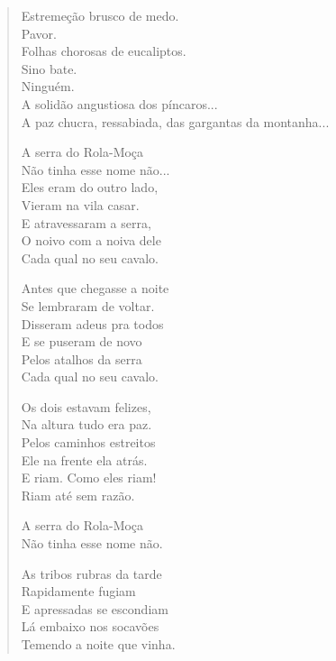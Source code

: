 \begin{verse}
Estremeção brusco de medo.\\
Pavor.\\
Folhas chorosas de eucaliptos.\\
Sino bate.\\
Ninguém.\\
A solidão angustiosa dos píncaros...\\
A paz chucra, ressabiada, das gargantas da montanha...


\quad\quad\quad{}A serra do Rola-Moça\\
\quad\quad\quad{}Não tinha esse nome não...\\
\quad\quad\quad{}Eles eram do outro lado,\\
\quad\quad\quad{}Vieram na vila casar.\\
\quad\quad\quad{}E atravessaram a serra,\\
\quad\quad\quad{}O noivo com a noiva dele\\
\quad\quad\quad{}Cada qual no seu cavalo.

\quad\quad\quad{}Antes que chegasse a noite\\
\quad\quad\quad{}Se lembraram de voltar.\\
\quad\quad\quad{}Disseram adeus pra todos\\
\quad\quad\quad{}E se puseram de novo\\
\quad\quad\quad{}Pelos atalhos da serra\\
\quad\quad\quad{}Cada qual no seu cavalo.

\quad\quad\quad{}Os dois estavam felizes,\\
\quad\quad\quad{}Na altura tudo era paz.\\
\quad\quad\quad{}Pelos caminhos estreitos\\
\quad\quad\quad{}Ele na frente ela atrás.\\
\quad\quad\quad{}E riam. Como eles riam!\\
\quad\quad\quad{}Riam até sem razão.

\quad\quad\quad{}A serra do Rola-Moça\\
\quad\quad\quad{}Não tinha esse nome não.

\quad\quad\quad{}As tribos rubras da tarde\\
\quad\quad\quad{}Rapidamente fugiam\\
\quad\quad\quad{}E apressadas se escondiam\\
\quad\quad\quad{}Lá embaixo nos socavões\\
\quad\quad\quad{}Temendo a noite que vinha.


\end{verse}
